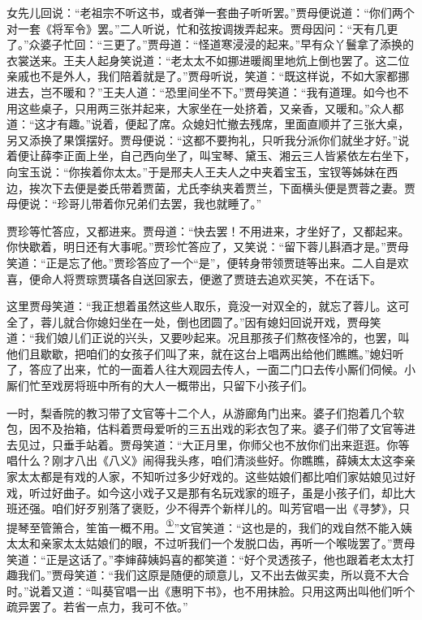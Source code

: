 女先儿回说：``老祖宗不听这书，或者弹一套曲子听听罢。''贾母便说道：``你们两个对一套《将军令》罢。''二人听说，忙和弦按调拨弄起来。贾母因问：``天有几更了。''众婆子忙回：``三更了。''贾母道：``怪道寒浸浸的起来。''早有众丫鬟拿了添换的衣裳送来。王夫人起身笑说道：``老太太不如挪进暖阁里地炕上倒也罢了。这二位亲戚也不是外人，我们陪着就是了。''贾母听说，笑道：``既这样说，不如大家都挪进去，岂不暖和？''王夫人道：``恐里间坐不下。''贾母笑道：``我有道理。如今也不用这些桌子，只用两三张并起来，大家坐在一处挤着，又亲香，又暖和。''众人都道：``这才有趣。''说着，便起了席。众媳妇忙撤去残席，里面直顺并了三张大桌，另又添换了果馔摆好。贾母便说：``这都不要拘礼，只听我分派你们就坐才好。''说着便让薛李正面上坐，自己西向坐了，叫宝琴、黛玉、湘云三人皆紧依左右坐下，向宝玉说：``你挨着你太太。''于是邢夫人王夫人之中夹着宝玉，宝钗等姊妹在西边，挨次下去便是娄氏带着贾菌，尤氏李纨夹着贾兰，下面横头便是贾蓉之妻。贾母便说：``珍哥儿带着你兄弟们去罢，我也就睡了。''

贾珍等忙答应，又都进来。贾母道：``快去罢！不用进来，才坐好了，又都起来。你快歇着，明日还有大事呢。''贾珍忙答应了，又笑说：``留下蓉儿斟酒才是。''贾母笑道：``正是忘了他。''贾珍答应了一个``是''，便转身带领贾琏等出来。二人自是欢喜，便命人将贾琮贾璜各自送回家去，便邀了贾琏去追欢买笑，不在话下。

这里贾母笑道：``我正想着虽然这些人取乐，竟没一对双全的，就忘了蓉儿。这可全了，蓉儿就合你媳妇坐在一处，倒也团圆了。''因有媳妇回说开戏，贾母笑道：``我们娘儿们正说的兴头，又要吵起来。况且那孩子们熬夜怪冷的，也罢，叫他们且歇歇，把咱们的女孩子们叫了来，就在这台上唱两出给他们瞧瞧。''媳妇听了，答应了出来，忙的一面着人往大观园去传人，一面二门口去传小厮们伺候。小厮们忙至戏房将班中所有的大人一概带出，只留下小孩子们。

一时，梨香院的教习带了文官等十二个人，从游廊角门出来。婆子们抱着几个软包，因不及抬箱，估料着贾母爱听的三五出戏的彩衣包了来。婆子们带了文官等进去见过，只垂手站着。贾母笑道：``大正月里，你师父也不放你们出来逛逛。你等唱什么？刚才八出《八义》闹得我头疼，咱们清淡些好。你瞧瞧，薛姨太太这李亲家太太都是有戏的人家，不知听过多少好戏的。这些姑娘们都比咱们家姑娘见过好戏，听过好曲子。如今这小戏子又是那有名玩戏家的班子，虽是小孩子们，却比大班还强。咱们好歹别落了褒贬，少不得弄个新样儿的。叫芳官唱一出《寻梦》，只提琴至管箫合，笙笛一概不用。\href{../Text/part0058_split_000.html\#lnkback_1_a}{\textsuperscript{①}}''文官笑道：``这也是的，我们的戏自然不能入姨太太和亲家太太姑娘们的眼，不过听我们一个发脱口齿，再听一个喉咙罢了。''贾母笑道：``正是这话了。''李婶薛姨妈喜的都笑道：``好个灵透孩子，他也跟着老太太打趣我们。''贾母笑道：``我们这原是随便的顽意儿，又不出去做买卖，所以竟不大合时。''说着又道：``叫葵官唱一出《惠明下书》，也不用抹脸。只用这两出叫他们听个疏异罢了。若省一点力，我可不依。''

